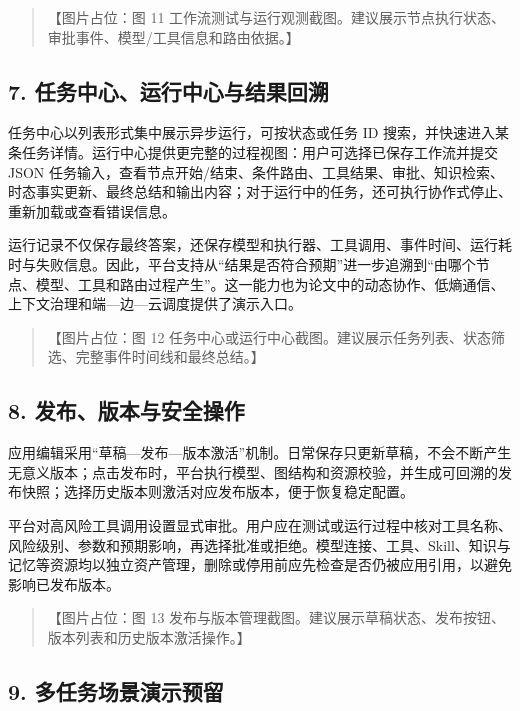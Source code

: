 \documentclass[UTF8,a4paper,12pt]{ctexart}
\begin{document}
\begin{quote}
【图片占位：图 11 工作流测试与运行观测截图。建议展示节点执行状态、审批事件、模型/工具信息和路由依据。】
\end{quote}

\subsection{7. 任务中心、运行中心与结果回溯}

任务中心以列表形式集中展示异步运行，可按状态或任务 ID 搜索，并快速进入某条任务详情。运行中心提供更完整的过程视图：用户可选择已保存工作流并提交 JSON 任务输入，查看节点开始/结束、条件路由、工具结果、审批、知识检索、时态事实更新、最终总结和输出内容；对于运行中的任务，还可执行协作式停止、重新加载或查看错误信息。

运行记录不仅保存最终答案，还保存模型和执行器、工具调用、事件时间、运行耗时与失败信息。因此，平台支持从``结果是否符合预期''进一步追溯到``由哪个节点、模型、工具和路由过程产生''。这一能力也为论文中的动态协作、低熵通信、上下文治理和端—边—云调度提供了演示入口。

\begin{quote}
【图片占位：图 12 任务中心或运行中心截图。建议展示任务列表、状态筛选、完整事件时间线和最终总结。】
\end{quote}

\subsection{8. 发布、版本与安全操作}

应用编辑采用``草稿—发布—版本激活''机制。日常保存只更新草稿，不会不断产生无意义版本；点击发布时，平台执行模型、图结构和资源校验，并生成可回溯的发布快照；选择历史版本则激活对应发布版本，便于恢复稳定配置。

平台对高风险工具调用设置显式审批。用户应在测试或运行过程中核对工具名称、风险级别、参数和预期影响，再选择批准或拒绝。模型连接、工具、Skill、知识与记忆等资源均以独立资产管理，删除或停用前应先检查是否仍被应用引用，以避免影响已发布版本。

\begin{quote}
【图片占位：图 13 发布与版本管理截图。建议展示草稿状态、发布按钮、版本列表和历史版本激活操作。】
\end{quote}

\subsection{9. 多任务场景演示预留}
\end{document}
